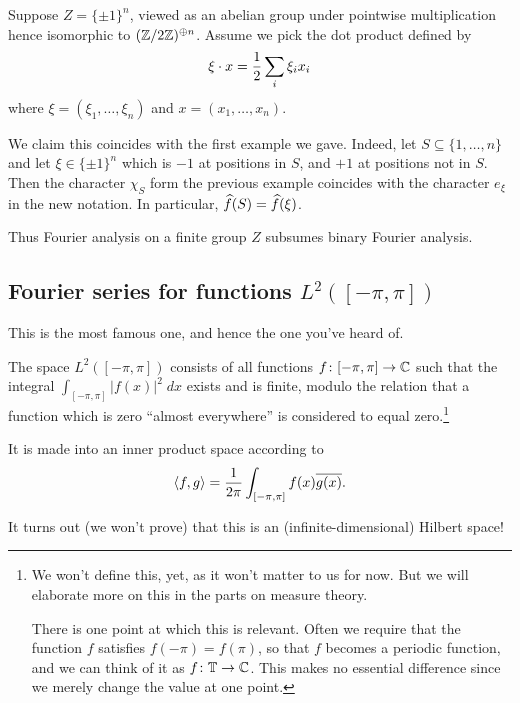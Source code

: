 \begin{example}
	Suppose $Z = \{\pm 1\}^n$, viewed as an abelian group
	under pointwise multiplication
	hence isomorphic to $(\mathbb Z/2\mathbb Z)^{\oplus n}$.
	Assume we pick the dot product defined by
	\[ \xi \cdot x = \frac{1}{2} \sum_i \xi_i x_i \]
	where $\xi = (\xi_1, \dots, \xi_n)$ and $x = (x_1, \dots, x_n)$.

	We claim this coincides with the first example we gave.
	Indeed, let $S \subseteq \{1, \dots, n\}$
	and let $\xi \in \{\pm1\}^n$ which is $-1$ at positions in $S$,
	and $+1$ at positions not in $S$.
	Then the character $\chi_S$ form the previous example
	coincides with the character $e_\xi$ in the new notation.
	In particular, $\widehat f(S) = \widehat f(\xi)$.

	Thus Fourier analysis on a finite group $Z$ subsumes
	binary Fourier analysis.
\end{example}

\subsection{Fourier series for functions $L^2([-\pi, \pi])$}
This is the most famous one, and hence the one you've heard of.
\begin{definition}
	The space $L^2([-\pi, \pi])$ consists of all functions
	$f \colon [-\pi, \pi] \to \mathbb C$ such that
	the integral
	$\int_{[-\pi, \pi]} \left\lvert f(x) \right\rvert^2 \; dx$
	exists and is finite,
	modulo the relation that a function which is zero ``almost everywhere''
	is considered to equal zero.\footnote{We won't define this, yet,
		as it won't matter to us for now.
		But we will elaborate more on this in the parts on measure theory.
	
		There is one point at which this is relevant.
		Often we require that the function $f$ satisfies $f(-\pi) = f(\pi)$,
		so that $f$ becomes a periodic function,
		and we can think of it as $f \colon \mathbb T \to \mathbb C$.
		This makes no essential difference
		since we merely change the value at one point.}

	It is made into an inner product space according to
	\[ \left< f,g \right>
		= \frac{1}{2\pi} \int_{[-\pi, \pi]} f(x) \overline{g(x)}. \]
\end{definition}
It turns out (we won't prove) that this is an
(infinite-dimensional) Hilbert space!

